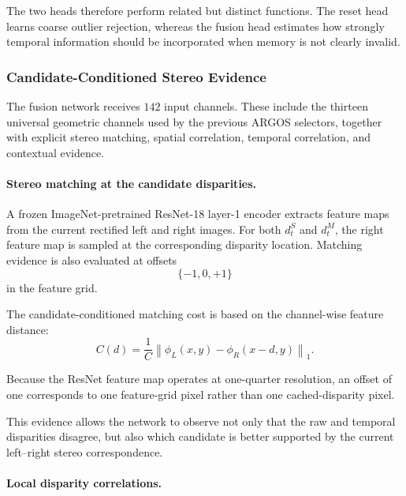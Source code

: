 \documentclass[11pt,a4paper]{article}
\begin{document}
The two heads therefore perform related but distinct functions. The reset head learns
coarse outlier rejection, whereas the fusion head estimates how strongly temporal
information should be incorporated when memory is not clearly invalid.

\subsubsection{Candidate-Conditioned Stereo Evidence}

The fusion network receives \(142\) input channels. These include the thirteen universal
geometric channels used by the previous ARGOS selectors, together with explicit stereo
matching, spatial correlation, temporal correlation, and contextual evidence.

\paragraph{Stereo matching at the candidate disparities.}

A frozen ImageNet-pretrained ResNet-18 layer-1 encoder extracts feature maps from the
current rectified left and right images. For both \(d_t^{S}\) and \(d_t^{M}\), the right
feature map is sampled at the corresponding disparity location. Matching evidence is also
evaluated at offsets
\begin{equation}
    \{-1,0,+1\}
\end{equation}
in the feature grid.

The candidate-conditioned matching cost is based on the channel-wise feature distance:
\begin{equation}
    C(d)
    =
    \frac{1}{C}
    \left\|
        \phi_L(x,y)
        -
        \phi_R(x-d,y)
    \right\|_1.
    \label{eq:candidate_matching_cost}
\end{equation}

Because the ResNet feature map operates at one-quarter resolution, an offset of one
corresponds to one feature-grid pixel rather than one cached-disparity pixel.

This evidence allows the network to observe not only that the raw and temporal
disparities disagree, but also which candidate is better supported by the current
left--right stereo correspondence.

\paragraph{Local disparity correlations.}
\end{document}
